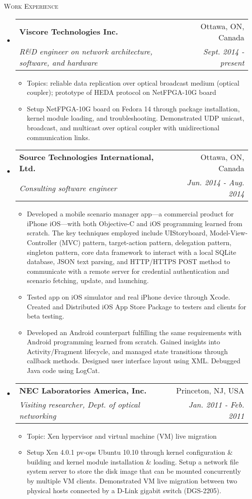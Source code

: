 \documentclass[letterpaper,11pt]{article}
\makeatletter
\newcommand{\resheading}[1]{{\noindent\large \colorbox{mygrey}{
\begin{minipage}{1.0\textwidth}{\textsc{#1 \vphantom{p\^{E}}}}\end{minipage}}}}
\newcommand{\ressubheading}[4]{
\begin{tabular*}{6.69in}{l@{\extracolsep{\fill}}r}
        \textbf{#1} & #2 \\
        \textit{#3} & \textit{#4} \\
\end{tabular*}\vspace{-6pt}
}
\newcommand{\resitem}[1]{\item #1 \vspace{-2pt}}
\makeatother
\begin{document}
\leftskip 0.0cm
\vspace{0.05in}
\resheading{Work Experience}%
\begin{itemize}
\setlength{\itemindent}{-0.075in}

\item
  \ressubheading{Viscore Technologies Inc.}{Ottawa, ON, Canada}
  {R\&D engineer on network architecture, software, and hardware}{Sept. 2014 - present}
  \begin{itemize}
    \resitem{Topics: reliable data replication over optical broadcast medium (optical coupler); prototype of HEDA protocol on NetFPGA-10G board}
    \resitem{Setup NetFPGA-10G board on Fedora 14 through package installation, kernel module loading, and troubleshooting. Demonstrated UDP unicast, broadcast, and multicast over optical coupler with unidirectional communication links.}
  \end{itemize}


\item
  \ressubheading{Source Technologies International, Ltd.}{Ottawa, ON, Canada}
  {Consulting software engineer}{Jun. 2014 - Aug. 2014}
  \begin{itemize}
    \resitem{Developed a mobile scenario manager app---a commercial product for iPhone iOS---with both Objective-C and iOS programming learned from scratch. The key techniques employed include UIStoryboard, Model-View-Controller (MVC) pattern, target-action pattern, delegation pattern, singleton pattern, core data framework to interact with a local SQLite database, JSON text parsing, and HTTP/HTTPS POST method to communicate with a remote server for credential authentication and scenario fetching, update, and launching.}
    \resitem{Tested app on iOS simulator and real iPhone device through Xcode. Created and Distributed iOS App Store Package to testers and clients for beta testing.}
    \resitem{Developed an Android counterpart fulfilling the same requirements with Android programming learned from scratch. Gained insights into Activity/Fragment lifecycle, and managed state transitions through callback methods. Designed user interface layout using XML. Debugged Java code using LogCat.}
  \end{itemize}

\item
    \ressubheading{NEC Laboratories America, Inc.}{Princeton, NJ, USA}%
    {Visiting researcher, Dept. of optical networking}{Jan. 2011 - Feb. 2011}
    \begin{itemize}
        \resitem{Topic: Xen hypervisor and virtual machine (VM) live migration}
        \resitem{Setup Xen 4.0.1 pv-ops Ubuntu 10.10 through kernel configuration \& building and kernel module installation \& loading. Setup a network file system server to store the disk image that can be mounted concurrently by multiple VM clients. Demonstrated VM live migration between two physical hosts connected by a D-Link gigabit switch (DGS-2205).}
    \end{itemize}


\end{itemize}
\end{document}
